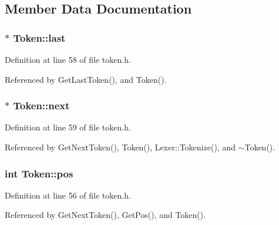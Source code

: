 \subsection{Member Data Documentation}
\subsubsection[{\texorpdfstring{last}{last}}]{$\ast$ Token\+::last\hspace{0.3cm}{\ttfamily [private]}}\hypertarget{structToken_a0ea44230386ca31fabb9a4946249d53f}{}\label{structToken_a0ea44230386ca31fabb9a4946249d53f}


Definition at line 58 of file token.\+h.



Referenced by Get\+Last\+Token(), and Token().

\subsubsection[{\texorpdfstring{next}{next}}]{$\ast$ Token\+::next\hspace{0.3cm}{\ttfamily [private]}}\hypertarget{structToken_a32f24a25af788c192e5b387dc8d67914}{}\label{structToken_a32f24a25af788c192e5b387dc8d67914}


Definition at line 59 of file token.\+h.



Referenced by Get\+Next\+Token(), Token(), Lexer\+::\+Tokenize(), and $\sim$\+Token().

\subsubsection[{\texorpdfstring{pos}{pos}}]{\setlength{\rightskip}{0pt plus 5cm}int Token\+::pos\hspace{0.3cm}{\ttfamily [private]}}\hypertarget{structToken_afc3014d7e8cbd70e58a55bea24fc2544}{}\label{structToken_afc3014d7e8cbd70e58a55bea24fc2544}


Definition at line 56 of file token.\+h.



Referenced by Get\+Next\+Token(), Get\+Pos(), and Token().

